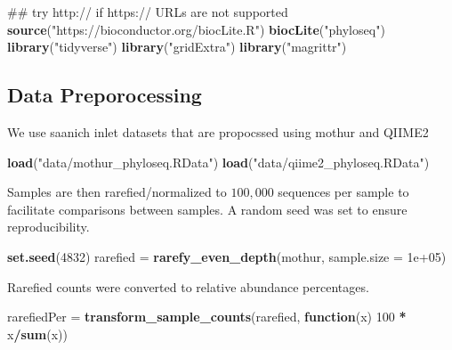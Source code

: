 \documentclass[11 pt,]{article}
\newenvironment{Shaded}{\begin{snugshade}}{\end{snugshade}}
\newcommand{\KeywordTok}[1]{\textcolor[rgb]{0.13,0.29,0.53}{\textbf{#1}}}
\newcommand{\DataTypeTok}[1]{\textcolor[rgb]{0.13,0.29,0.53}{#1}}
\newcommand{\DecValTok}[1]{\textcolor[rgb]{0.00,0.00,0.81}{#1}}
\newcommand{\FloatTok}[1]{\textcolor[rgb]{0.00,0.00,0.81}{#1}}
\newcommand{\StringTok}[1]{\textcolor[rgb]{0.31,0.60,0.02}{#1}}
\newcommand{\ControlFlowTok}[1]{\textcolor[rgb]{0.13,0.29,0.53}{\textbf{#1}}}
\newcommand{\OperatorTok}[1]{\textcolor[rgb]{0.81,0.36,0.00}{\textbf{#1}}}
\newcommand{\NormalTok}[1]{#1}
\begin{document}
\begin{Shaded}
\begin{Highlighting}[]
\NormalTok{## try http:// if https:// URLs are not supported}
\KeywordTok{source}\NormalTok{(}\StringTok{"https://bioconductor.org/biocLite.R"}\NormalTok{)}
\KeywordTok{biocLite}\NormalTok{(}\StringTok{"phyloseq"}\NormalTok{)}
\KeywordTok{library}\NormalTok{(}\StringTok{"tidyverse"}\NormalTok{)}
\KeywordTok{library}\NormalTok{(}\StringTok{"gridExtra"}\NormalTok{)}
\KeywordTok{library}\NormalTok{(}\StringTok{"magrittr"}\NormalTok{)}
\end{Highlighting}
\end{Shaded}

\subsection{Data Preporocessing}\label{data-preporocessing}

We use saanich inlet datasets that are propocssed using mothur and
QIIME2

\begin{Shaded}
\begin{Highlighting}[]
\KeywordTok{load}\NormalTok{(}\StringTok{"data/mothur_phyloseq.RData"}\NormalTok{)}
\KeywordTok{load}\NormalTok{(}\StringTok{"data/qiime2_phyloseq.RData"}\NormalTok{)}
\end{Highlighting}
\end{Shaded}

Samples are then rarefied/normalized to \(100,000\) sequences per sample
to facilitate comparisons between samples. A random seed was set to
ensure reproducibility.

\begin{Shaded}
\begin{Highlighting}[]
\KeywordTok{set.seed}\NormalTok{(}\DecValTok{4832}\NormalTok{)}
\NormalTok{rarefied =}\StringTok{ }\KeywordTok{rarefy_even_depth}\NormalTok{(mothur, }\DataTypeTok{sample.size =} \FloatTok{1e+05}\NormalTok{)}
\end{Highlighting}
\end{Shaded}

Rarefied counts were converted to relative abundance percentages.

\begin{Shaded}
\begin{Highlighting}[]
\NormalTok{rarefiedPer =}\StringTok{ }\KeywordTok{transform_sample_counts}\NormalTok{(rarefied, }\ControlFlowTok{function}\NormalTok{(x) }\DecValTok{100} \OperatorTok{*}\StringTok{ }\NormalTok{x}\OperatorTok{/}\KeywordTok{sum}\NormalTok{(x))}
\end{Highlighting}
\end{Shaded}
\end{document}
